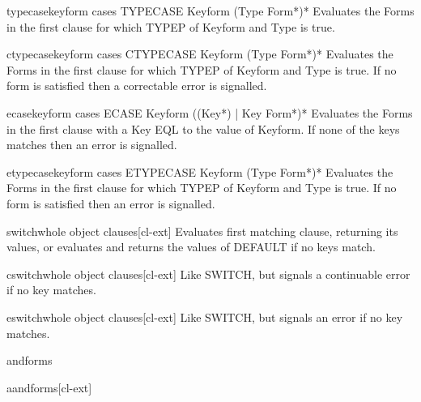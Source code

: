 \documentclass[10pt,english]{book}
\begin{document}
\begin{macro}{typecase}{keyform \body cases}
  TYPECASE Keyform {(Type Form*)}*
  Evaluates the Forms in the first clause for which TYPEP of Keyform and Type
  is true.
\end{macro}

\begin{macro}{ctypecase}{keyform \body cases}
  CTYPECASE Keyform {(Type Form*)}*
  Evaluates the Forms in the first clause for which TYPEP of Keyform and Type
  is true. If no form is satisfied then a correctable error is signalled.
\end{macro}

\begin{macro}{ecase}{keyform \body cases}
  ECASE Keyform {({(Key*) | Key} Form*)}*
  Evaluates the Forms in the first clause with a Key EQL to the value of
  Keyform. If none of the keys matches then an error is signalled.
\end{macro}

\begin{macro}{etypecase}{keyform \body cases}
  ETYPECASE Keyform {(Type Form*)}*
  Evaluates the Forms in the first clause for which TYPEP of Keyform and Type
  is true. If no form is satisfied then an error is signalled.
\end{macro}

\begin{macro}{switch}{\whole whole object \body clauses}[cl-ext]
  Evaluates first matching clause, returning its values, or evaluates and
returns the values of DEFAULT if no keys match.
\end{macro}

\begin{macro}{cswitch}{\whole whole object \body clauses}[cl-ext]
  Like SWITCH, but signals a continuable error if no key matches.
\end{macro}

\begin{macro}{eswitch}{\whole whole object \body clauses}[cl-ext]
  Like SWITCH, but signals an error if no key matches.
\end{macro}

\begin{macro}{and}{\rest forms}
  
\end{macro}

\begin{macro}{aand}{\rest forms}[cl-ext]
  
\end{macro}
\end{document}
